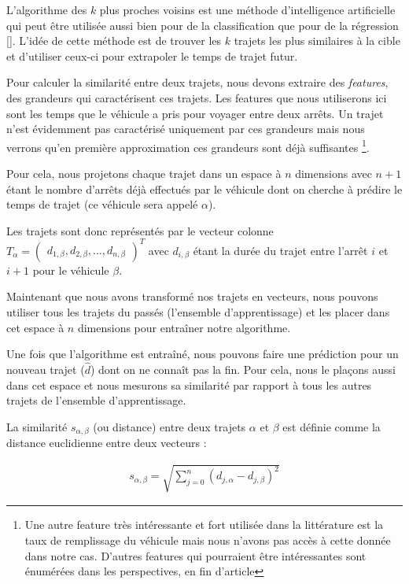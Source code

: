 \documentclass[letterpaper]{article}
\begin{document}
L'algorithme des $k$ plus proches voisins
est une méthode d'intelligence artificielle qui peut être utilisée aussi bien pour de la classification que pour de la régression [\cite{trevor2009elements}].
L'idée de cette méthode est de trouver les $k$ trajets les plus similaires à la cible et d'utiliser ceux-ci pour extrapoler le temps de trajet futur.

Pour calculer la similarité entre deux trajets, nous devons extraire des \textit{features}, des grandeurs qui caractérisent ces trajets. Les features que nous utiliserons ici sont les temps que le véhicule a pris pour voyager entre deux arrêts. Un trajet n'est évidemment pas caractérisé uniquement par ces grandeurs mais nous verrons qu'en première approximation ces grandeurs sont déjà suffisantes \footnote{Une autre feature très intéressante et fort utilisée dans la littérature est la taux de remplissage du véhicule mais nous n'avons pas accès à cette donnée dans notre cas. D'autres features qui pourraient être intéressantes sont énumérées dans les perspectives, en fin d'article}.

Pour cela, nous projetons chaque trajet dans un espace à $n$ dimensions avec $n+1$ étant le nombre d'arrêts déjà effectués par le véhicule dont on cherche à prédire le temps de trajet (ce véhicule sera appelé $\alpha$).

Les trajets sont donc représentés par le vecteur colonne
$T_{\alpha} = \begin{pmatrix}d_{1,\beta}, d_{2,\beta}, ..., d_{n,\beta}\end{pmatrix}^{T}$
avec $d_{i,\beta}$ étant la durée du trajet entre l'arrêt $i$ et $i+1$ pour le véhicule $\beta$.

Maintenant que nous avons transformé nos trajets en vecteurs, nous pouvons utiliser tous les trajets du passés (l'ensemble d'apprentissage) et les placer dans cet espace à $n$ dimensions pour entraîner notre algorithme.

Une fois que l'algorithme est entraîné, nous pouvons faire une prédiction pour un nouveau trajet ($\hat{d}$) dont on ne connaît pas la fin. Pour cela, nous le plaçons aussi dans cet espace et nous mesurons sa similarité par rapport à tous les autres trajets de l'ensemble d'apprentissage.

La similarité $s_{\alpha,\beta}$ (ou distance) entre deux trajets $\alpha$ et $\beta$ est définie comme la distance euclidienne entre deux vecteurs :

\begin{eqnarray}
s_{\alpha,\beta} = \sqrt{\sum_{j=0}^{n}(d_{j,\alpha} - d_{j,\beta})^2}
\end{eqnarray}
\end{document}
